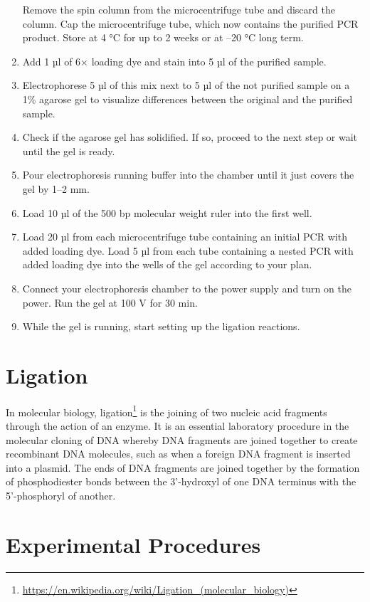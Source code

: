\documentclass[]{book}
\let\rmarkdownfootnote\footnote%
\def\footnote{\protect\rmarkdownfootnote}
\renewcommand{\href}[2]{#2\footnote{\url{#1}}}
\theoremstyle{definition}
\theoremstyle{definition}
\theoremstyle{definition}
\theoremstyle{remark}
\begin{document}
\begin{enumerate}
  Remove the spin column from the microcentrifuge tube and discard the
  column. Cap the microcentrifuge tube, which now contains the purified
  PCR product. Store at 4 °C for up to 2 weeks or at --20 °C long term.
\item
  Add 1 µl of 6× loading dye and stain into 5 µl of the purified sample.
\item
  Electrophorese 5 µl of this mix next to 5 µl of the not purified
  sample on a 1\% agarose gel to visualize differences between the
  original and the purified sample.
\item
  Check if the agarose gel has solidified. If so, proceed to the next
  step or wait until the gel is ready.
\item
  Pour electrophoresis running buffer into the chamber until it just
  covers the gel by 1--2 mm.
\item
  Load 10 µl of the 500 bp molecular weight ruler into the first well.
\item
  Load 20 µl from each microcentrifuge tube containing an initial PCR
  with added loading dye. Load 5 µl from each tube containing a nested
  PCR with added loading dye into the wells of the gel according to your
  plan.
\item
  Connect your electrophoresis chamber to the power supply and turn on
  the power. Run the gel at 100 V for 30 min.
\item
  While the gel is running, start setting up the ligation reactions.
\end{enumerate}

\section{Ligation}\label{ligation}

In molecular biology,
\href{https://en.wikipedia.org/wiki/Ligation_(molecular_biology)}{ligation}
is the joining of two nucleic acid fragments through the action of an
enzyme. It is an essential laboratory procedure in the molecular cloning
of DNA whereby DNA fragments are joined together to create recombinant
DNA molecules, such as when a foreign DNA fragment is inserted into a
plasmid. The ends of DNA fragments are joined together by the formation
of phosphodiester bonds between the 3'-hydroxyl of one DNA terminus with
the 5'-phosphoryl of another.

\section{Experimental Procedures}\label{experimental-procedures-14}
\end{document}
